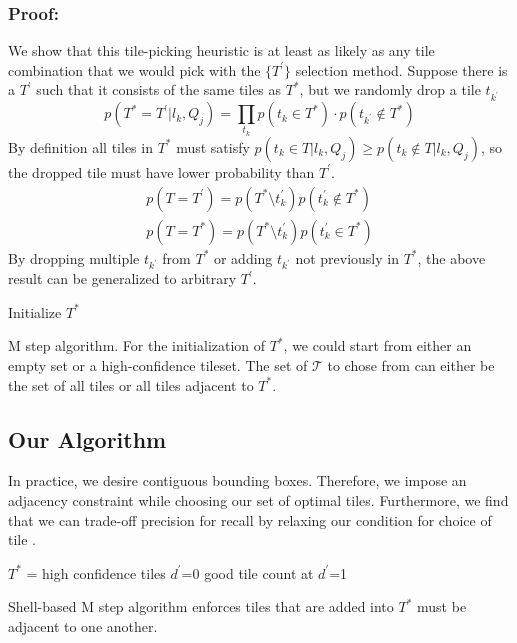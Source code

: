 {\subsubsection{Proof:}
We show that this tile-picking heuristic is at least as likely as any tile combination that we would pick with the $\{T^{\prime}\}$ selection method. Suppose there is a $T^\prime$ such that it consists of the same tiles as $T^*$, but we randomly drop a tile $t_{k^\prime}$
\begin{equation}
p(T^*=T^\prime|l_k,Q_j)=\prod_{t_k} p(t_k\in T^*)\cdot p(t_{k^\prime}\notin T^*)
\end{equation}
By definition all tiles in $T^*$ must satisfy $p(t_k\in T|l_k,Q_j)\geq p(t_k\notin T|l_k,Q_j)$, so the dropped tile must have lower probability than $T^\prime$.
\begin{align}
p(T=T^\prime)=p(T^*\setminus t_k^\prime) p(t_k^\prime \notin T^*) \\
% 
% 
p(T=T^*)=p(T^*\setminus t_k^\prime) p(t_k^\prime \in T^*) 
\end{align}
By dropping multiple $t_{k^\prime}$ from $T^*$ or adding $t_{k^\prime}$ not previously in $T^*$, the above result can be generalized to arbitrary $T^\prime$.
\begin{algorithm}[ht!]
 Initialize $T^*$\;
 \caption{M step algorithm. For the initialization of $T^*$, we could start from either an empty set or a high-confidence tileset. The set of $\mathcal{T}$ to chose from can either be the set of all tiles or all tiles adjacent to $T^*$. }\label{Mstep}
\end{algorithm}

\subsection{Our Algorithm}
In practice, we desire contiguous bounding boxes. Therefore, we impose an adjacency constraint while choosing our set of optimal tiles. Furthermore, we find that we can trade-off precision for recall by relaxing our condition for choice of tile .
\begin{algorithm}[ht!]
 $T^*$ = high confidence tiles\;
 $d^\prime$=0\;
 good tile count at $d^\prime$=1\;
 \caption{Shell-based M step algorithm enforces tiles that are added into $T^*$ must be adjacent to one another.}\label{Mstep}
\end{algorithm}

}